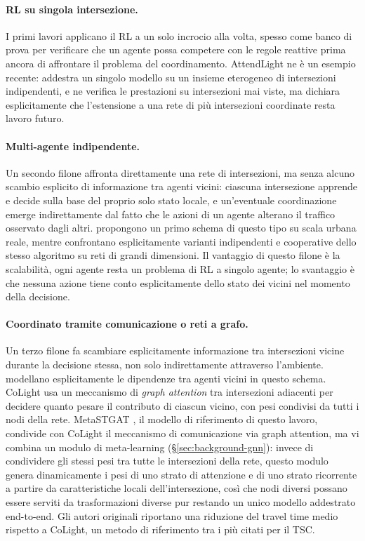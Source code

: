 \paragraph{RL su singola intersezione.} I primi lavori applicano il RL a
un solo incrocio alla volta, spesso come banco di prova per verificare
che un agente possa competere con le regole reattive prima ancora di
affrontare il problema del coordinamento. AttendLight
\citep{oroojlooy2020attendlight} ne è un esempio recente: addestra un
singolo modello su un insieme eterogeneo di intersezioni indipendenti, e
ne verifica le prestazioni su intersezioni mai viste, ma dichiara
esplicitamente che l'estensione a una rete di più intersezioni coordinate
resta lavoro futuro.

\paragraph{Multi-agente indipendente.} Un secondo filone affronta
direttamente una rete di intersezioni, ma senza alcuno scambio esplicito
di informazione tra agenti vicini: ciascuna intersezione apprende e
decide sulla base del proprio solo stato locale, e un'eventuale
coordinazione emerge indirettamente dal fatto che le azioni di un agente
alterano il traffico osservato dagli altri. \citet{eltantawy2013marlin}
propongono un primo schema di questo tipo su scala urbana reale, mentre
\citet{chu2019marl} confrontano esplicitamente varianti indipendenti e
cooperative dello stesso algoritmo su reti di grandi dimensioni.
Il vantaggio di questo filone è la scalabilità, ogni agente resta un
problema di RL a singolo agente; lo svantaggio è che nessuna azione tiene
conto esplicitamente dello stato dei vicini nel momento della decisione.

\paragraph{Coordinato tramite comunicazione o reti a grafo.} Un terzo
filone fa scambiare esplicitamente informazione tra intersezioni vicine
durante la decisione stessa, non solo indirettamente attraverso
l'ambiente. \citet{zhang2025dependency} modellano esplicitamente le
dipendenze tra agenti vicini in questo schema. CoLight
\citep{wei2019colight} usa un meccanismo di \emph{graph attention} tra
intersezioni adiacenti per decidere quanto pesare il contributo di
ciascun vicino, con pesi condivisi da tutti i nodi della rete. MetaSTGAT
\citep{wang2022metastgat}, il modello di riferimento di questo lavoro,
condivide con CoLight il meccanismo di comunicazione via graph attention,
ma vi combina un modulo di meta-learning (§\ref{sec:background-gnn}):
invece di condividere gli stessi pesi tra tutte le intersezioni della
rete, questo modulo genera dinamicamente i pesi di uno strato di
attenzione e di uno strato ricorrente a partire da caratteristiche locali
dell'intersezione, così che nodi diversi possano essere serviti da
trasformazioni diverse pur restando un unico modello addestrato
end-to-end. Gli autori originali riportano una riduzione del travel time
medio rispetto a CoLight, un metodo di riferimento tra i più citati per
il TSC.

